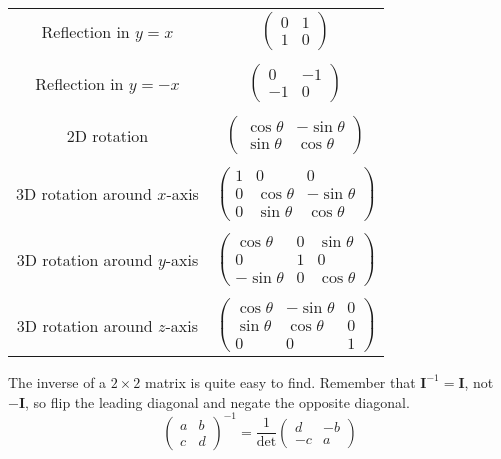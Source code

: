 \documentclass[../main.tex]{subfile}
\begin{document}
\vspace*{-2ex}
\begin{center}
\begin{tabular}{c c}
	Reflection in $y = x$ & $\begin{pmatrix}0 & 1\\ 1 & 0\end{pmatrix}$\\
	\hphantom{} & \hphantom{}\\
	Reflection in $y = -x$ & $\begin{pmatrix}0 & -1\\ -1 & 0\end{pmatrix}$\\
	\hphantom{} & \hphantom{}\\
	2D rotation & $\begin{pmatrix}\cos\theta & -\sin\theta\\ \sin\theta & \cos\theta\end{pmatrix}$\\
	\hphantom{} & \hphantom{}\\
	3D rotation around $x$-axis & $\begin{pmatrix}1 & 0 & 0\\ 0 & \cos\theta & -\sin\theta\\ 0 & \sin\theta & \cos\theta\end{pmatrix}$\\
	\hphantom{} & \hphantom{}\\
	3D rotation around $y$-axis & $\begin{pmatrix}\cos\theta & 0 & \sin\theta\\ 0 & 1 & 0\\ -\sin\theta & 0 & \cos\theta\end{pmatrix}$\\
	\hphantom{} & \hphantom{}\\
	3D rotation around $z$-axis & $\begin{pmatrix}\cos\theta & -\sin\theta & 0\\ \sin\theta & \cos\theta & 0\\ 0 & 0 & 1\end{pmatrix}$\\
\end{tabular}
\end{center}

\newpage


The inverse of a $2 \times 2$ matrix is quite easy to find. Remember that $\mathbf{I}^{-1} = \mathbf{I}$, not $-\mathbf{I}$, so flip the leading diagonal and negate the opposite diagonal.
$$\boxed{\begin{pmatrix}a & b\\ c & d\end{pmatrix}^{-1} = \frac{1}{\det}\begin{pmatrix}d & -b\\ -c & a\end{pmatrix}}$$
\end{document}
